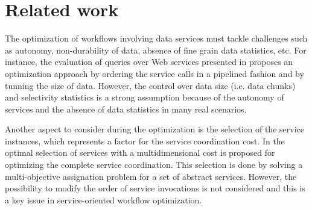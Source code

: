 
\section{Related work} \label{sec:relatedwork}

The optimization of workflows involving data services must tackle challenges such as autonomy, non-durability of data, absence of fine grain data statistics, etc. For instance, the evaluation of queries over Web services presented in \cite{Srivastava2006} proposes an optimization approach by ordering the service calls in a pipelined fashion and by tunning the size of data. However, the control over data size (i.e. data chunks) and selectivity statistics is a strong assumption because of the autonomy of services and the absence of data statistics in many real scenarios.

Another aspect to consider during the optimization is the selection of the service instances, which represents a factor for the service coordination cost. In \cite{Claro2005,Wada2008} the optimal selection of services with a multidimensional cost is proposed for optimizing the complete service coordination. This selection is done by solving a multi-objective assignation problem for a set of abstract services. However, the possibility to modify the order of service invocations is not considered and this is a key issue in service-oriented workflow optimization.

